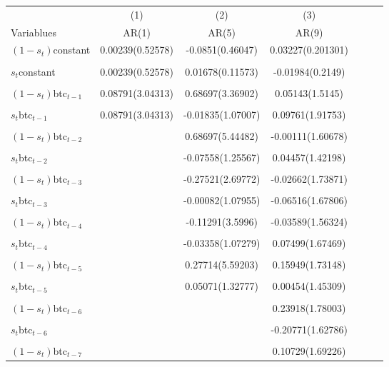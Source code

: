\documentclass{article}
\begin{document}
\begin{table}[h!]
  \begin{center}
    \begin{tabular}{lcccccc}
       & (1) & (2) & (3) \\
      Variablues & AR(1) & AR(5) & AR(9)  \\
      \hline
      $(1-s_t)$constant & 0.00239(0.52578) & -0.0851(0.46047) & 0.03227(0.201301) \\
      \\
      $s_t$constant & 0.00239(0.52578) & 0.01678(0.11573) & -0.01984(0.2149) \\
      \\
      $(1-s_t)$btc$_{t-1}$ & 0.08791(3.04313) & 0.68697(3.36902) & 0.05143(1.5145)  \\
      \\
      $s_t$btc$_{t-1}$ & 0.08791(3.04313) & -0.01835(1.07007) & 0.09761(1.91753) \\
      \\
      $(1-s_t)$btc$_{t-2}$ & & 0.68697(5.44482) &  -0.00111(1.60678) \\
      \\
      $s_t$btc$_{t-2}$ & & -0.07558(1.25567) & 0.04457(1.42198) \\
      \\
      $(1-s_t)$btc$_{t-3}$ & & -0.27521(2.69772) & -0.02662(1.73871) \\
      \\
      $s_t$btc$_{t-3}$ & & -0.00082(1.07955) & -0.06516(1.67806) \\
      \\
      $(1-s_t)$btc$_{t-4}$ & & -0.11291(3.5996) &  -0.03589(1.56324) \\
      \\
      $s_t$btc$_{t-4}$ & & -0.03358(1.07279) &  0.07499(1.67469) \\
      \\
      $(1-s_t)$btc$_{t-5}$ & & 0.27714(5.59203) & 0.15949(1.73148)  \\
      \\
      $s_t$btc$_{t-5}$ & & 0.05071(1.32777) & 0.00454(1.45309) \\
      \\
      $(1-s_t)$btc$_{t-6}$ & & & 0.23918(1.78003)  \\
      \\
      $s_t$btc$_{t-6}$ & & & -0.20771(1.62786) \\
      \\
      $(1-s_t)$btc$_{t-7}$ & & & 0.10729(1.69226)  \\

\end{tabular}
\end{center}
\end{table}
\end{document}
